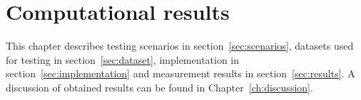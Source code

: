 \chapter{Computational results}\label{ch:computational-results}

This chapter describes testing scenarios in section~\ref{sec:scenarios},
datasets used for testing in section~\ref{sec:dataset},
implementation in section~\ref{sec:implementation} and
measurement results in section~\ref{sec:results}.
A discussion of obtained results can be found in Chapter~\ref{ch:discussion}.





